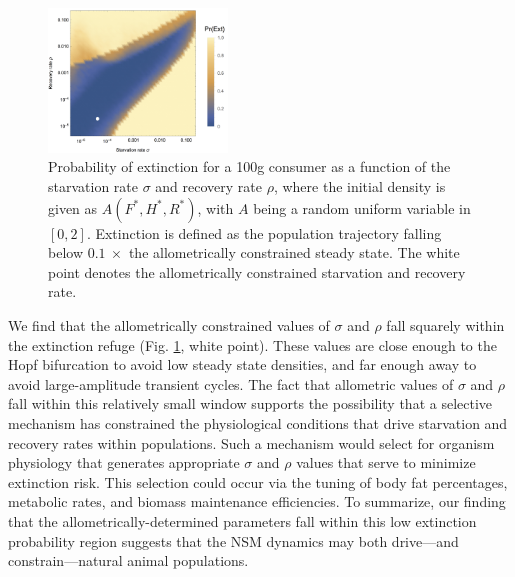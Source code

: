 \documentclass[twocolumn,preprintnumbers,amsmath,amssymb,superscriptaddress]{revtex4}
\begin{document}
\begin{figure}
\includegraphics[width=0.425\textwidth]{fig_ExtinctionAllometric.jpg}
\caption{\small Probability of extinction for a 100g consumer as a function of the
  starvation rate $\sigma$ and recovery rate $\rho$, where the initial
  density is given as $A(F^*,H^*,R^*)$, with $A$ being a random uniform
  variable in $[0,2]$.  Extinction is defined as the population trajectory
  falling below $0.1~\times$ the allometrically constrained steady state. The
  white point denotes the allometrically constrained starvation and recovery
  rate.}
\label{fig:ext}
\end{figure} 

We find that the allometrically constrained values of $\sigma$ and $\rho$
fall squarely within the extinction refuge (Fig. \ref{fig:ext}, white point).
These values are close enough to the Hopf bifurcation to avoid low steady
state densities, and far enough away to avoid large-amplitude transient
cycles.  The fact that allometric values of $\sigma$ and $\rho$ fall within
this relatively small window supports the possibility that a selective
mechanism has constrained the physiological conditions that drive starvation
and recovery rates within populations.  Such a mechanism would select for
organism physiology that generates appropriate $\sigma$ and $\rho$ values
that serve to minimize extinction risk.  This selection could occur via the
tuning of body fat percentages, metabolic rates, and biomass maintenance
efficiencies.  To summarize, our finding that the allometrically-determined
parameters fall within this low extinction probability region suggests that
the NSM dynamics may both drive---and constrain---natural animal populations.
\end{document}
